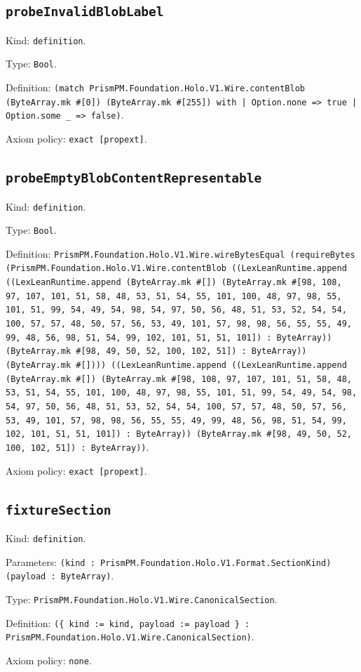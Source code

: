 \documentclass[11pt]{article}
\begin{document}
\subsection*{\texttt{probeInvalidBlobLabel}}
\noindent Kind: \texttt{definition}.\par
\noindent Type: \texttt{Bool}.\par
\noindent Definition: \texttt{(match PrismPM.Foundation.Holo.V1.Wire.contentBlob (ByteArray.mk \#[0]) (ByteArray.mk \#[255]) with | Option.none => true | Option.some \_ => false)}.\par
\noindent Axiom policy: \texttt{exact [propext]}.\par
\subsection*{\texttt{probeEmptyBlobContentRepresentable}}
\noindent Kind: \texttt{definition}.\par
\noindent Type: \texttt{Bool}.\par
\noindent Definition: \texttt{PrismPM.Foundation.Holo.V1.Wire.wireBytesEqual (requireBytes (PrismPM.Foundation.Holo.V1.Wire.contentBlob ((LexLeanRuntime.append ((LexLeanRuntime.append (ByteArray.mk \#[]) (ByteArray.mk \#[98, 108, 97, 107, 101, 51, 58, 48, 53, 51, 54, 55, 101, 100, 48, 97, 98, 55, 101, 51, 99, 54, 49, 54, 98, 54, 97, 50, 56, 48, 51, 53, 52, 54, 54, 100, 57, 57, 48, 50, 57, 56, 53, 49, 101, 57, 98, 98, 56, 55, 55, 49, 99, 48, 56, 98, 51, 54, 99, 102, 101, 51, 51, 101]) : ByteArray)) (ByteArray.mk \#[98, 49, 50, 52, 100, 102, 51]) : ByteArray)) (ByteArray.mk \#[]))) ((LexLeanRuntime.append ((LexLeanRuntime.append (ByteArray.mk \#[]) (ByteArray.mk \#[98, 108, 97, 107, 101, 51, 58, 48, 53, 51, 54, 55, 101, 100, 48, 97, 98, 55, 101, 51, 99, 54, 49, 54, 98, 54, 97, 50, 56, 48, 51, 53, 52, 54, 54, 100, 57, 57, 48, 50, 57, 56, 53, 49, 101, 57, 98, 98, 56, 55, 55, 49, 99, 48, 56, 98, 51, 54, 99, 102, 101, 51, 51, 101]) : ByteArray)) (ByteArray.mk \#[98, 49, 50, 52, 100, 102, 51]) : ByteArray))}.\par
\noindent Axiom policy: \texttt{exact [propext]}.\par
\subsection*{\texttt{fixtureSection}}
\noindent Kind: \texttt{definition}.\par
\noindent Parameters: \texttt{(kind : PrismPM.Foundation.Holo.V1.Format.SectionKind) (payload : ByteArray)}.\par
\noindent Type: \texttt{PrismPM.Foundation.Holo.V1.Wire.CanonicalSection}.\par
\noindent Definition: \texttt{(\{ kind := kind, payload := payload \} : PrismPM.Foundation.Holo.V1.Wire.CanonicalSection)}.\par
\noindent Axiom policy: \texttt{none}.\par
\end{document}
